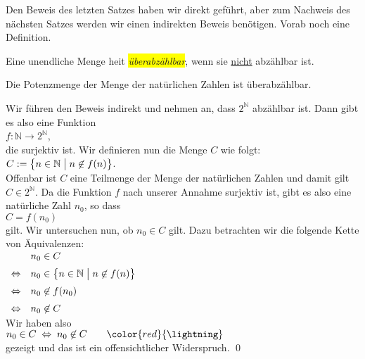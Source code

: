 Den Beweis des letzten Satzes haben wir direkt gef\"{u}hrt, aber zum Nachweis des n\"{a}chsten Satzes werden wir
einen indirekten Beweis ben\"{o}tigen.  Vorab noch eine Definition.

\begin{Definition} \lb
Eine unendliche Menge hei\3t \colorbox{yellow}{\emph{\"{u}berabz\"{a}hlbar}}, wenn sie \underline{nicht} abz\"{a}hlbar ist.
\end{Definition}

\begin{Satz}
  Die Potenzmenge der Menge der nat\"{u}rlichen Zahlen ist \"{u}berabz\"{a}hlbar.
\end{Satz}

\proof
Wir f\"{u}hren den Beweis indirekt und nehmen an, dass $2^{\mathbb{N}}$ abz\"{a}hlbar ist.  Dann gibt es also
eine Funktion
\\[0.2cm]
\hspace*{1.3cm}
$f: \mathbb{N} \rightarrow 2^{\mathbb{N}}$,
\\[0.2cm]
die surjektiv ist.  Wir definieren nun die Menge $C$ wie folgt:
\\[0.2cm]
\hspace*{1.3cm}
$C := \bigl\{ n \in \mathbb{N} \bigm| n \not\in f(n) \bigr\}$.
\\[0.2cm]
Offenbar ist $C$ eine Teilmenge der Menge der nat\"{u}rlichen Zahlen und damit gilt $C \in 2^{\mathbb{N}}$.
Da die Funktion $f$ nach unserer Annahme surjektiv ist, gibt es also eine nat\"{u}rliche Zahl $n_0$, so
dass 
\\[0.2cm]
\hspace*{1.3cm}
$C = f(n_0)$
\\[0.2cm]
gilt.  Wir untersuchen nun, ob $n_0 \in C$ gilt.  Dazu betrachten wir die folgende Kette von
\"{A}quivalenzen: 
\\[0.2cm]
\hspace*{1.3cm}
$
\begin{array}[t]{cl}
                & n_0 \in C                                                      \\[0.2cm]
\Leftrightarrow & n_0 \in \bigl\{ n \in \mathbb{N} \bigm| n \not\in f(n) \bigr\} \\[0.2cm]
\Leftrightarrow & n_0 \not\in f(n_0)                                             \\[0.2cm]
\Leftrightarrow & n_0 \not\in C                                               
\end{array}
$
\\[0.2cm]
Wir haben also
\\[0.2cm]
\hspace*{1.3cm}
$n_0 \in C \;\Leftrightarrow\; n_0 \not\in C \qquad \color{red}{\lightning}$
\\[0.2cm]
gezeigt und das ist ein offensichtlicher Widerspruch. \qed

